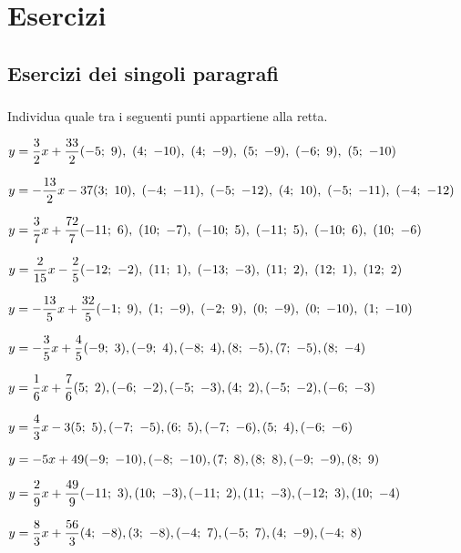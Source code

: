 
\section{Esercizi}

\subsection{Esercizi dei singoli paragrafi}

\subsubsection*{}

\begin{esercizio}\label{ese:}
 Individua quale tra i seguenti punti appartiene alla retta.
 \begin{enumeratea}
  \item  $y = \dfrac{3}{2} x +\dfrac{33}{2} 
  \hfill (-5;~9),~(4;~-10),~(4;~-9),~(5;~-9),~(-6;~9),~(5;~-10)$
  \item  $y = -\dfrac{13}{2} x -37 
  \hfill (3;~10),~(-4;~-11),~(-5;~-12),~(4;~10),~(-5;~-11),~(-4;~-12)$
  \item  $y = \dfrac{3}{7} x +\dfrac{72}{7} 
  \hfill (-11;~6),~(10;~-7),~(-10;~5),~(-11;~5),~(-10;~6),~(10;~-6)$
  \item  $y = \dfrac{2}{15} x -\dfrac{2}{5} 
  \hfill (-12;~-2),~(11;~1),~(-13;~-3),~(11;~2),~(12;~1),~(12;~2)$
  \item  $y = -\dfrac{13}{5} x +\dfrac{32}{5} 
  \hfill (-1;~9),~(1;~-9),~(-2;~9),~(0;~-9),~(0;~-10),~(1;~-10)$
  \item  $y = -\dfrac{3}{5} x +\dfrac{4}{5} 
  \hfill (-9;~3), (-9;~4), (-8;~4), (8;~-5), (7;~-5), (8;~-4)$
  \item  $y = \dfrac{1}{6} x +\dfrac{7}{6} 
  \hfill (5;~2), (-6;~-2), (-5;~-3), (4;~2), (-5;~-2), (-6;~-3)$
  \item  $y = \dfrac{4}{3} x -3 
  \hfill (5;~5), (-7;~-5), (6;~5), (-7;~-6), (5;~4), (-6;~-6)$
  \item  $y = -5 x +49 
  \hfill (-9;~-10), (-8;~-10), (7;~8), (8;~8), (-9;~-9), (8;~9)$
  \item  $y = \dfrac{2}{9} x +\dfrac{49}{9} 
  \hfill (-11;~3), (10;~-3), (-11;~2), (11;~-3), (-12;~3), (10;~-4)$
  \item  $y = \dfrac{8}{3} x +\dfrac{56}{3} 
  \hfill (4;~-8), (3;~-8), (-4;~7), (-5;~7), (4;~-9), (-4;~8)$

\end{enumeratea}
\end{esercizio}
